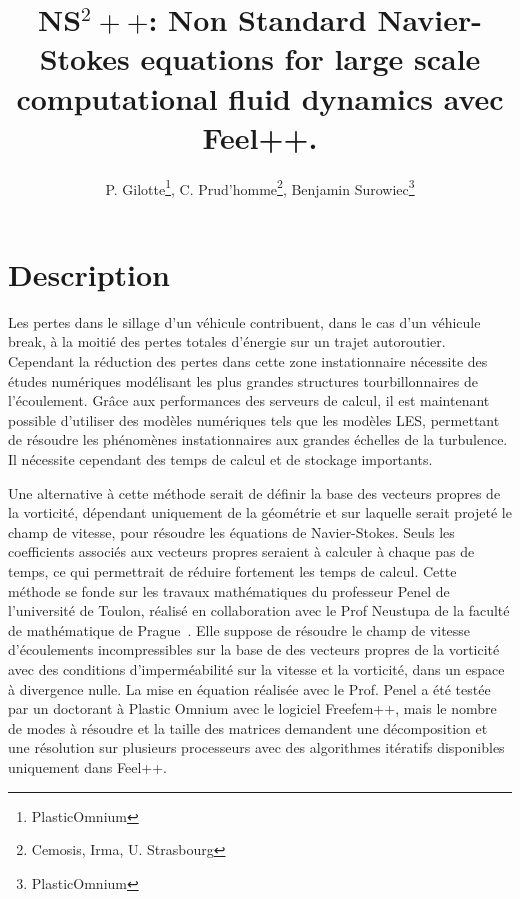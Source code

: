 \documentclass[12pt]{article}
\title{NS$^2++$: Non Standard Navier-Stokes equations for large scale computational
fluid dynamics avec Feel++.}
\author{P. Gilotte\thanks{PlasticOmnium}, C. Prud'homme\thanks{Cemosis,
Irma, U. Strasbourg}, Benjamin Surowiec\thanks{PlasticOmnium}}
\begin{document}
\maketitle


\section{Description}
\label{sec:description}

Les pertes dans le sillage d’un véhicule contribuent, dans le cas d’un véhicule
break, à la moitié des pertes totales d’énergie sur un trajet
autoroutier. Cependant la réduction des pertes dans cette zone instationnaire
nécessite des études numériques modélisant les plus grandes structures
tourbillonnaires de l’écoulement. Grâce aux performances des serveurs de calcul,
il est maintenant possible d’utiliser des modèles numériques tels que les
modèles LES, permettant de résoudre les phénomènes instationnaires aux grandes
échelles de la turbulence. Il nécessite cependant des temps de calcul et de
stockage importants.

Une alternative à cette méthode serait de définir la base des vecteurs propres
de la vorticité, dépendant uniquement de la géométrie et sur laquelle serait
projeté le champ de vitesse, pour résoudre les équations de Navier-Stokes. Seuls
les coefficients associés aux vecteurs propres seraient à calculer à chaque pas
de temps, ce qui permettrait de réduire fortement les temps de calcul. Cette
méthode se fonde sur les travaux mathématiques du professeur Penel de
l’université de Toulon, réalisé en collaboration avec le Prof Neustupa de la
faculté de mathématique de Prague~\cite{Penel2004}. Elle suppose de résoudre le
champ de vitesse d’écoulements incompressibles sur la base de des vecteurs
propres de la vorticité avec des conditions d’imperméabilité sur la vitesse et
la vorticité, dans un espace à divergence nulle. La mise en équation réalisée
avec le Prof. Penel a été testée par un doctorant à Plastic Omnium avec le
logiciel Freefem++, mais le nombre de modes à résoudre et la taille des matrices
demandent une décomposition et une résolution sur plusieurs processeurs avec des
algorithmes itératifs disponibles uniquement dans Feel++.
\end{document}
